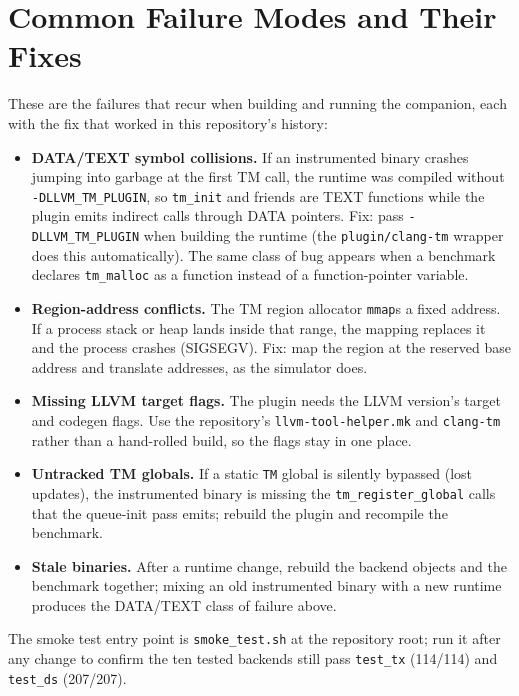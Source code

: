 \section{Common Failure Modes and Their Fixes}

These are the failures that recur when building and running the companion,
each with the fix that worked in this repository's history:

\begin{itemize}
    \item \textbf{DATA/TEXT symbol collisions.}  If an instrumented binary
          crashes jumping into garbage at the first TM call, the runtime was
          compiled without \texttt{-DLLVM\_TM\_PLUGIN}, so \texttt{tm\_init}
          and friends are TEXT functions while the plugin emits indirect
          calls through DATA pointers.  Fix: pass \texttt{-DLLVM\_TM\_PLUGIN}
          when building the runtime (the \texttt{plugin/clang-tm} wrapper
          does this automatically).  The same class of bug appears when a
          benchmark declares \texttt{tm\_malloc} as a function instead of a
          function-pointer variable.
    \item \textbf{Region-address conflicts.}  The TM region allocator
          \texttt{mmap}s a fixed address.  If a process stack or heap
          lands inside that range, the mapping replaces it and the process
          crashes (SIGSEGV).  Fix: map the region at the reserved base
          address and translate addresses, as the simulator does.
    \item \textbf{Missing LLVM target flags.}  The plugin needs the LLVM
          version's target and codegen flags.  Use the repository's
          \texttt{llvm-tool-helper.mk} and \texttt{clang-tm} rather than a
          hand-rolled build, so the flags stay in one place.
    \item \textbf{Untracked TM globals.}  If a static
          \texttt{TM} global is silently bypassed (lost updates), the
          instrumented binary is missing the \texttt{tm\_register\_global}
          calls that the queue-init pass emits; rebuild the plugin and
          recompile the benchmark.
    \item \textbf{Stale binaries.}  After a runtime change, rebuild the
          backend objects and the benchmark together; mixing an old
          instrumented binary with a new runtime produces the DATA/TEXT
          class of failure above.
\end{itemize}

The smoke test entry point is \texttt{smoke\_test.sh} at the repository
root; run it after any change to confirm the ten tested backends still pass
\texttt{test\_tx} (114/114) and \texttt{test\_ds} (207/207).
